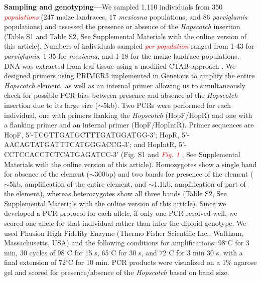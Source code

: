 \documentclass[11pt]{article} %
\newcommand{\track}[1]{\textcolor{red}{\emph{\normalsize #1}} }
\begin{document}
\begin{linenumbers}
\begin{flushleft}
\textbf{Sampling and genotyping---}We sampled 1,110 individuals from 350 \track{populations} (247 maize landraces, 17 \emph{mexicana} populations, and 86 \emph{parviglumis} populations) and assessed the presence or absence of the \emph{Hopscotch} insertion (Table S1 and Table S2, See Supplemental Materials with the online version of this article). Numbers of individuals sampled \track{per population} ranged from 1-43 for \emph{parviglumis}, 1-35 for \emph{mexicana}, and 1-18 for the maize landrace populations. DNA was extracted from leaf tissue using a modified CTAB approach \citep{DoyleDoyle1990, Maloof1984}. We designed primers using PRIMER3 \citep{RozenSkaletsky2000} implemented in Geneious \citep{Kearse2012} to amplify the entire \emph{Hopscotch} element, as well as an internal primer allowing us to simultaneously check for possible PCR bias between presence and absence of the \emph{Hopscotch} insertion due to its large size ($\sim$5kb). Two PCRs were performed for each individual, one with primers flanking the \emph{Hopscotch} (HopF/HopR) and one with a flanking primer and an internal primer (HopF/HopIntR). Primer sequences are HopF, {\small 5'-TCGTTGATGCTTTGATGGATGG-3'}; 
HopR, {\small 5'-AACAGTATGATTTCATGGGACCG-3'}; and HopIntR, {\small  5'-CCTCCACCTCTCATGAGATCC-3'} (Fig. S1 and \track{Fig. 1}, See Supplemental Materials with the online version of this article). Homozygotes show a single band for absence of the element ($\sim$300bp) and two bands for presence of the element ($\sim$5kb, amplification of the entire element, and $\sim$1.1kb, amplification of part of the element), whereas heterozygotes show all three bands (Table S2, See Supplemental Materials with the online version of this article). Since we developed a PCR protocol for each allele, if only one PCR resolved well, we scored one allele for that individual rather than infer the diploid genotype. We used Phusion High Fidelity Enzyme (Thermo Fisher Scientific Inc., Waltham, Massachusetts, USA) and the following conditions for amplifications: 98$^{\circ}$C for 3 min, 30 cycles of 98$^{\circ}$C for 15 s, 65$^{\circ}$C for 30 s, and 72$^{\circ}$C for 3 min 30 s, with a final extension of 72$^{\circ}$C for 10 min. PCR products were visualized on a 1\% agarose gel and scored for presence/absence of the \emph{Hopscotch} based on band size.


\end{flushleft}
\end{linenumbers}
\end{document}
